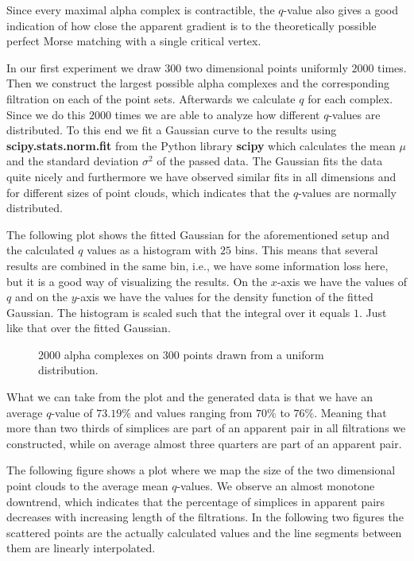 Since every maximal alpha complex is contractible, the $q$-value also gives a good indication of how close the apparent gradient is to the theoretically possible perfect Morse matching with a single critical vertex.

In our first experiment we draw $300$ two dimensional points uniformly $2000$ times. Then we construct the largest possible alpha complexes and the corresponding filtration on each of the point sets. Afterwards we calculate $q$ for each complex. Since we do this $2000$ times we are able to analyze how different $q$-values are distributed. To this end we fit a Gaussian curve to the results using \textbf{scipy.stats.norm.fit} from the Python library \textbf{scipy} which calculates the mean $\mu$ and the standard deviation $\sigma^2$ of the passed data. The Gaussian fits the data quite nicely and furthermore we have observed similar fits in all dimensions and for different sizes of point clouds, which indicates that the $q$-values are normally distributed.

The following plot shows the fitted Gaussian for the aforementioned setup and the calculated $q$ values as a histogram with $25$ bins. This means that several results are combined in the same bin, i.e., we have some information loss here, but it is a good way of visualizing the results. On the $x$-axis we have the values of $q$ and on the $y$-axis we have the values for the density function of the fitted Gaussian. The histogram is scaled such that the integral over it equals $1$. Just like that over the fitted Gaussian.

\begin{figure}[H]
\begin{subfigure}[c]{0.95\textwidth}
\begin{center}

\end{center}
\end{subfigure}
\caption{2000 alpha complexes on 300 points drawn from a uniform distribution.}
\label{fig:300fit}
\end{figure}

What we can take from the plot and the generated data is that we have an average $q$-value of $73.19\%$ and values ranging from  $70\%$ to $76\%$. Meaning that more than two thirds of simplices are part of an apparent pair in all filtrations we constructed, while on average almost three quarters are part of an apparent pair.

The following figure shows a plot where we map the size of the two dimensional point clouds to the average mean $q$-values. We observe an almost monotone downtrend, which indicates that the percentage of simplices in apparent pairs decreases with increasing length of the filtrations. In the following two figures the scattered points are the actually calculated values and the line segments between them are linearly interpolated.

